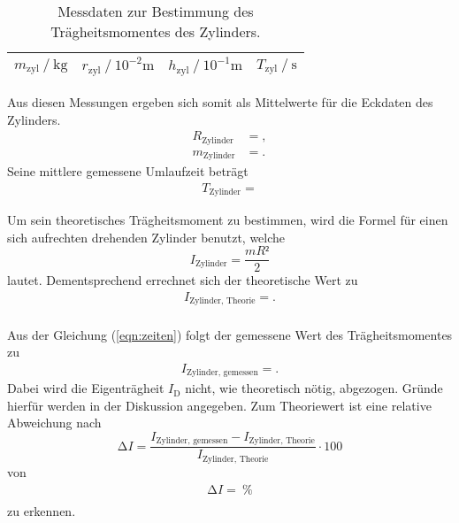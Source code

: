 \begin{table}[H]
  \centering
  \caption{Messdaten zur Bestimmung des Trägheitsmomentes des Zylinders.}
  \label{tab:zyl}
  \begin{tabular}{c c c c}
    \toprule
    {$m_\text{zyl} \ /\ \si{\kilo\gram}$} & {$r_\text{zyl} \ /\ 10^{-2} \si{\metre}$} & {$h_\text{zyl} \ /\ 10^{-1}\si{\metre}$} & {$T_\text{zyl} \ /\ \si{\second}$}\\
    \midrule
    
    \bottomrule
  \end{tabular}
\end{table}

Aus diesen Messungen ergeben sich somit als Mittelwerte für die Eckdaten des Zylinders.
\begin{align*}
  R_{\text{Zylinder}} &= , \\
  m_{\text{Zylinder}} &= .
\end{align*}
Seine mittlere gemessene Umlaufzeit beträgt
\begin{align*}
  T_{\text{Zylinder}} = 
\end{align*}

Um sein theoretisches Trägheitsmoment zu bestimmen, wird die Formel für einen sich aufrechten drehenden Zylinder benutzt, welche
\begin{equation}
  I_{\text{Zylinder}} = \frac{mR²}{2}
\end{equation}
lautet.
Dementsprechend errechnet sich der theoretische Wert zu
\begin{align*}
  I_{\text{Zylinder, Theorie}} = . \\
\end{align*}

Aus der Gleichung (\ref{eqn:zeiten}) folgt der gemessene Wert des Trägheitsmomentes zu
\begin{align*}
  I_{\text{Zylinder, gemessen}} = .
\end{align*}
Dabei wird die Eigenträgheit $I_\text{D}$ nicht, wie theoretisch nötig, abgezogen.
Gründe hierfür werden in der Diskussion angegeben.
Zum Theoriewert ist eine relative Abweichung nach
\begin{equation}
  \increment I = \frac{I_{\text{Zylinder, gemessen}} - I_{\text{Zylinder, Theorie}}}{I_{\text{Zylinder, Theorie}}} \cdot 100
\end{equation}
von
\begin{align*}
  \increment I =  \:\si{\percent} \\
\end{align*}
zu erkennen.



